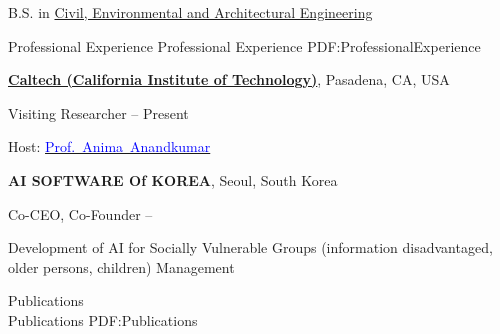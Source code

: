 \documentclass[letterpaper,MMMyyyy,nonstopmode]{simpleresumecv}
\begin{document}
\begin{Body}
\BulletItem
B.S. in
\href{https://ace.korea.ac.kr:59034/eng/index.php}
{Civil, Environmental and Architectural Engineering}
\begin{Detail}
\end{Detail}




\Section
{Professional Experience}
{Professional Experience}
{PDF:ProfessionalExperience}

\Entry
\href{https://www.caltech.edu/}
{\textbf{Caltech (California Institute of Technology)}},
Pasadena, CA, USA

\Gap
\BulletItem
Visiting Researcher
\hfill
{} --
Present
\begin{Detail}
\SubBulletItem
Host:
\href{http://tensorlab.cms.caltech.edu/users/anima/}
{\textcolor{blue}{Prof.~Anima~Anandkumar}}
\end{Detail}

\BigGap
\Entry
{\textbf{AI SOFTWARE Of KOREA}},
Seoul, South Korea

\Gap
\BulletItem
Co-CEO, Co-Founder
\hfill
{} --
\begin{Detail}
\SubBulletItem
Development of AI for Socially Vulnerable Groups (information disadvantaged, older persons, children)
\SubBulletItem
Management
\end{Detail}


\Section
{Publications\\ \scriptsize{}}
{Publications}
{PDF:Publications}


\end{Body}
\end{document}
